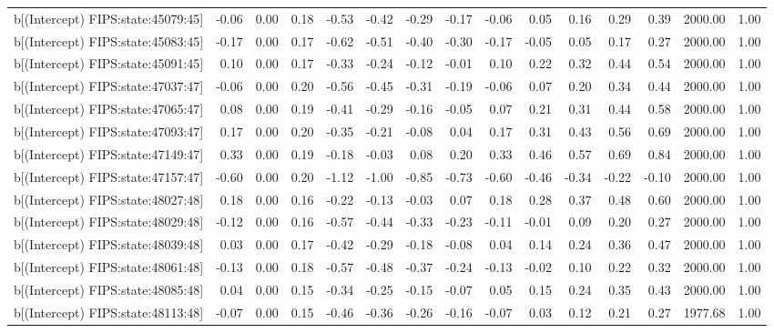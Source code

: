 \begin{table}[ht]
\begin{tabular}{rrrrrrrrrrrrrrr}
  b[(Intercept) FIPS:state:45079:45] & -0.06 & 0.00 & 0.18 & -0.53 & -0.42 & -0.29 & -0.17 & -0.06 & 0.05 & 0.16 & 0.29 & 0.39 & 2000.00 & 1.00 \\ 
  b[(Intercept) FIPS:state:45083:45] & -0.17 & 0.00 & 0.17 & -0.62 & -0.51 & -0.40 & -0.30 & -0.17 & -0.05 & 0.05 & 0.17 & 0.27 & 2000.00 & 1.00 \\ 
  b[(Intercept) FIPS:state:45091:45] & 0.10 & 0.00 & 0.17 & -0.33 & -0.24 & -0.12 & -0.01 & 0.10 & 0.22 & 0.32 & 0.44 & 0.54 & 2000.00 & 1.00 \\ 
  b[(Intercept) FIPS:state:47037:47] & -0.06 & 0.00 & 0.20 & -0.56 & -0.45 & -0.31 & -0.19 & -0.06 & 0.07 & 0.20 & 0.34 & 0.44 & 2000.00 & 1.00 \\ 
  b[(Intercept) FIPS:state:47065:47] & 0.08 & 0.00 & 0.19 & -0.41 & -0.29 & -0.16 & -0.05 & 0.07 & 0.21 & 0.31 & 0.44 & 0.58 & 2000.00 & 1.00 \\ 
  b[(Intercept) FIPS:state:47093:47] & 0.17 & 0.00 & 0.20 & -0.35 & -0.21 & -0.08 & 0.04 & 0.17 & 0.31 & 0.43 & 0.56 & 0.69 & 2000.00 & 1.00 \\ 
  b[(Intercept) FIPS:state:47149:47] & 0.33 & 0.00 & 0.19 & -0.18 & -0.03 & 0.08 & 0.20 & 0.33 & 0.46 & 0.57 & 0.69 & 0.84 & 2000.00 & 1.00 \\ 
  b[(Intercept) FIPS:state:47157:47] & -0.60 & 0.00 & 0.20 & -1.12 & -1.00 & -0.85 & -0.73 & -0.60 & -0.46 & -0.34 & -0.22 & -0.10 & 2000.00 & 1.00 \\ 
  b[(Intercept) FIPS:state:48027:48] & 0.18 & 0.00 & 0.16 & -0.22 & -0.13 & -0.03 & 0.07 & 0.18 & 0.28 & 0.37 & 0.48 & 0.60 & 2000.00 & 1.00 \\ 
  b[(Intercept) FIPS:state:48029:48] & -0.12 & 0.00 & 0.16 & -0.57 & -0.44 & -0.33 & -0.23 & -0.11 & -0.01 & 0.09 & 0.20 & 0.27 & 2000.00 & 1.00 \\ 
  b[(Intercept) FIPS:state:48039:48] & 0.03 & 0.00 & 0.17 & -0.42 & -0.29 & -0.18 & -0.08 & 0.04 & 0.14 & 0.24 & 0.36 & 0.47 & 2000.00 & 1.00 \\ 
  b[(Intercept) FIPS:state:48061:48] & -0.13 & 0.00 & 0.18 & -0.57 & -0.48 & -0.37 & -0.24 & -0.13 & -0.02 & 0.10 & 0.22 & 0.32 & 2000.00 & 1.00 \\ 
  b[(Intercept) FIPS:state:48085:48] & 0.04 & 0.00 & 0.15 & -0.34 & -0.25 & -0.15 & -0.07 & 0.05 & 0.15 & 0.24 & 0.35 & 0.43 & 2000.00 & 1.00 \\ 
  b[(Intercept) FIPS:state:48113:48] & -0.07 & 0.00 & 0.15 & -0.46 & -0.36 & -0.26 & -0.16 & -0.07 & 0.03 & 0.12 & 0.21 & 0.27 & 1977.68 & 1.00 \\ 

\end{tabular}
\end{table}
